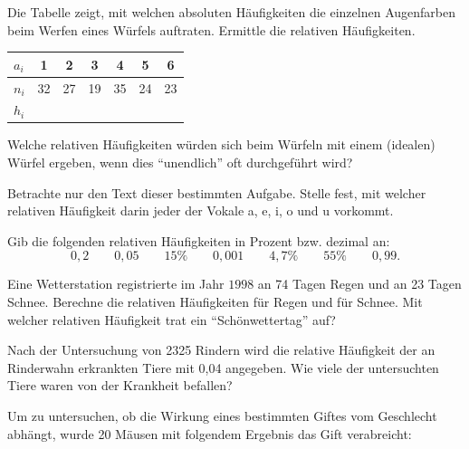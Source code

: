 \documentclass[a4paper, twoside, parskip, 10pt, smallheadings]{scrbook}
\theoremstyle{plain}
\theoremstyle{definition}
\begin{document}
\item Die Tabelle zeigt, mit welchen absoluten H\"{a}ufigkeiten die
einzelnen Augenfarben beim Werfen eines W\"{u}rfels auftraten. Ermittle die relativen
H\"{a}ufigkeiten.
\begin{center}
\begin{tabular}{|l|c|c|c|c|c|c|}
\hline
  $a_i$ & 1 & 2 & 3 & 4 & 5 & 6 \\
\hline
  $n_i$ & 32 & 27 & 19 & 35 & 24 & 23 \\
\hline
  $h_i$ &  &  &  &  &  &  \\
\hline
\end{tabular}
\end{center}
 Welche relativen H\"{a}ufigkeiten w\"{u}rden sich beim W\"{u}rfeln
mit einem (idealen) W\"{u}rfel ergeben, wenn dies "`unendlich"' oft durchgef\"{u}hrt wird?
\item Betrachte nur den Text dieser bestimmten Aufgabe. Stelle
fest, mit welcher relativen H\"{a}ufigkeit darin jeder der Vokale a, e, i, o und u vorkommt.
\item Gib die folgenden relativen H\"{a}ufigkeiten in Prozent  bzw.
dezimal an: \[0,2 \qquad 0,05 \qquad 15\% \qquad 0,001 \qquad 4,7\% \qquad 55\% \qquad 0,99.\]
\item Eine Wetterstation registrierte im Jahr $1998$ an 74 Tagen
Regen und an 23 Tagen Schnee. Berechne die relativen H\"{a}ufigkeiten f\"{u}r Regen und f\"{u}r
Schnee. Mit welcher relativen H\"{a}ufigkeit trat ein "`Sch\"{o}nwettertag"' auf?
\item Nach der Untersuchung von 2325 Rindern wird die relative
H\"{a}ufigkeit der an Rinderwahn erkrankten Tiere mit 0,04 angegeben. Wie viele der untersuchten
Tiere waren von der Krankheit befallen?
\item Um zu untersuchen, ob die Wirkung eines bestimmten Giftes
vom Geschlecht abh\"{a}ngt, wurde 20 M\"{a}usen mit folgendem Ergebnis das Gift verabreicht:
\end{document}

